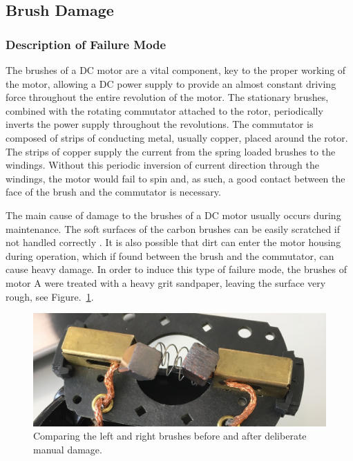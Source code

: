 \subsection{Brush Damage}

\subsubsection{Description of Failure Mode}
The brushes of a DC motor are a vital component, key to the proper working of the motor, allowing a DC power supply to provide an almost constant driving force throughout the entire revolution of the motor. The stationary brushes, combined with the rotating commutator attached to the rotor, periodically inverts the power supply throughout the revolutions. The commutator is composed of strips of conducting metal, usually copper, placed around the rotor. The strips of copper supply the current from the spring loaded brushes to the windings.  Without this periodic inversion of current direction through the windings, the motor would fail to spin and, as such, a good contact between the face of the brush and the commutator is necessary. 

The main cause of damage to the brushes of a DC motor usually occurs during maintenance. The soft surfaces of the carbon brushes can be easily scratched if not handled correctly \cite{hamilton2000dc}. It is also possible that dirt can enter the motor housing during operation, which if found between the brush and the commutator, can cause heavy damage. In order to induce this type of failure mode, the brushes of motor A were treated with a heavy grit sandpaper, leaving the surface very rough, see Figure.~\ref{fig:brush_damage}.

\begin{figure}[t]
    \includegraphics[width=1.0\textwidth]{fig/brush_comparison.jpg}
    \caption[Brush Damage]{Comparing the left and right brushes before and after deliberate manual damage.}
    \label{fig:brush_damage}
\end{figure}

